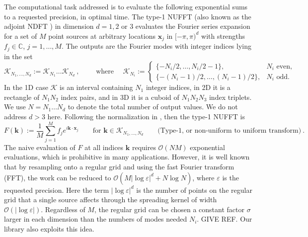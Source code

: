 \documentclass[10pt]{article}
\newcommand{\be}{\begin{equation}}
\newcommand{\ee}{\end{equation}}
\newcommand{\mbf}[1]{{\mathbf #1}}
\newcommand{\eps}{\varepsilon}
\newcommand{\bigO}{{\mathcal O}}
\newcommand{\xx}{\mbf{x}}
\newcommand{\kk}{\mbf{k}}
\newcommand{\KK}{{\mathcal K}}
\newcommand{\NU}{{non-uniform}}
\newcommand{\U}{{uniform}}
\begin{document}
The computational task addressed
is to evaluate the following exponential sums to a requested precision,
in optimal time.
The type-1 NUFFT (also known as the adjoint NDFT \cite{usingnfft})
in dimension $d=1,2$ or 3
evaluates the Fourier series expansion for a set of
$M$ point sources at arbitrary locations $\xx_j$ in $[-\pi,\pi)^d$ with
strengths $f_j\in\mathbb{C}$,  $j=1,\dots,M$.
The outputs are the Fourier modes with integer indices lying in
the set
\be
\KK_{N_1,\dots,N_d} := \KK_{N_1} \dots \KK_{N_d}~,
\qquad\mbox{ where } \quad
\KK_{N_i} := \left\{\begin{array}{ll} \{-N_i/2,\ldots,N_i/2-1\}, & N_i \mbox{ even},\\
\{-(N_i-1)/2,\ldots,(N_i-1)/2\}, & N_i \mbox{ odd}.
\end{array}\right.
\label{KK}
\ee
In the 1D case $\KK$ is an interval containing $N_1$ integer indices, in 2D it is a rectangle of $N_1N_2$ index pairs, and in 3D it is a cuboid of $N_1N_2N_3$ index triplets.
We use $N=N_1\dots N_d$ to denote the total number of output values.
We do not address $d>3$ here.
Following the normalization in \cite{dutt,nufft}, then the type-1 NUFFT is
\be
F(\kk) := \frac{1}{M} \sum_{j=1}^M f_j e^{i \kk\cdot \xx_j}
\qquad \mbox{for } \kk \in \KK_{N_1,\dots,N_d}
\qquad \mbox{(Type-1, or \NU\ to \U\ transform)}
~.
\label{1}
\ee
The naive evaluation of $F$ at all indices $\kk$ requires $\bigO(NM)$
exponential evaluations, which is prohibitive
in many applications.
However, it is well known that by resampling onto a regular
grid and using the fast Fourier transform (FFT),
the work can be reduced to $\bigO(M |\log\eps|^d + N \log N)$,
where $\eps$ is the requested precision.
Here the term $|\log\eps|^d$ is the number of points on the regular
grid that a single source affects through the spreading kernel
of width $\bigO(|\log\eps|)$.
Regardless of $M$, the regular grid can be chosen a constant factor
$\sigma$ larger in each dimension than the numbers of modes needed $N_i$.
GIVE REF.
Our library also exploits this idea.
\end{document}
